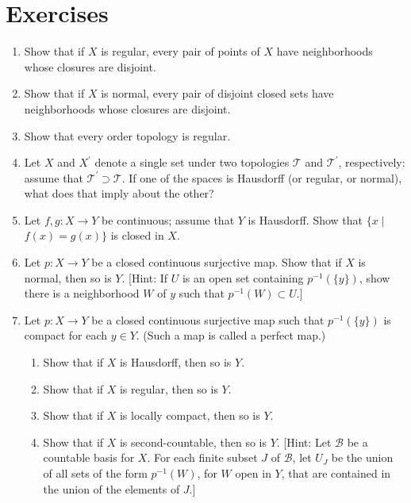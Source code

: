 \section*{Exercises}
\begin{enumerate}[itemsep=0.4em, parsep=0pt, topsep=0pt, partopsep=0pt, leftmargin=*, label=\arabic*., ref=\arabic*]
\item Show that if \(X\) is regular, every pair of points of \(X\) have neighborhoods whose closures are disjoint.
\item Show that if \(X\) is normal, every pair of disjoint closed sets have neighborhoods whose closures are disjoint.
\item Show that every order topology is regular.
\item Let \(X\) and \(X^{\prime }\) denote a single set under two topologies \(\mathcal{T}\) and \(\mathcal{T}^{\prime }\), respectively: assume that \(\mathcal{T}^{\prime } \supset \mathcal{T}\). If one of the spaces is Hausdorff (or regular, or normal), what does that imply about the other?
\item Let \(f,g : X \rightarrow Y\) be continuous; assume that \(Y\) is Hausdorff. Show that \(\{ x \mid\) \(f(x) = g(x) \}\) is closed in \(X\).
\item Let \(p : X \rightarrow Y\) be a closed continuous surjective map. Show that if \(X\) is normal, then so is \(Y\). [Hint: If \(U\) is an open set containing \(p^{-1}( {\{ y\} })\), show there is a neighborhood \(W\) of \(y\) such that \(p^{-1}( W) \subset U\).]
\item Let \(p : X \rightarrow Y\) be a closed continuous surjective map such that \(p^{-1}( {\{ y\} })\) is compact for each \(y \in Y\). (Such a map is called a perfect map.)
 \begin{enumerate}[itemsep=0.2em, parsep=0pt, topsep=0pt, partopsep=0pt, leftmargin=*, label=(\alph*), align=left]
 \item Show that if \(X\) is Hausdorff, then so is \(Y\).
 \item Show that if \(X\) is regular, then so is \(Y\).
 \item Show that if \(X\) is locally compact, then so is \(Y\).
 \item Show that if \(X\) is second-countable, then so is \(Y\). [Hint: Let \(\mathcal{B}\) be a countable basis for \(X\). For each finite subset \(J\) of \(\mathcal{B}\), let \(U_{J}\) be the union of all sets of the form \(p^{-1}( W)\), for \(W\) open in \(Y\), that are contained in the union of the elements of \(J\).]

\end{enumerate}
\end{enumerate}
